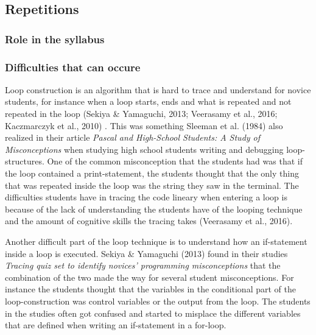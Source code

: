 \subsection{Repetitions}

\subsubsection{Role in the syllabus}

\subsubsection{Difficulties that can occure}

Loop construction is an algorithm that is hard to trace and understand for novice students, for instance when a loop starts, ends and what is repeated and not repeated in the loop (Sekiya \& Yamaguchi, 2013; Veerasamy et al., 2016; Kaczmarczyk et al., 2010) . This was something Sleeman et al. (1984) also realized in their article \emph{Pascal and High-School Students: A Study of Misconceptions} when studying high school students writing and debugging loop-structures. One of the common misconception that the students had was that if the loop contained a print-statement, the students thought that the only thing that was repeated inside the loop was the string they saw in the terminal. The difficulties students have in tracing the code lineary when entering a loop is because of the lack of understanding the students have of the looping technique and the amount of cognitive skills the tracing takes (Veerasamy et al., 2016). 

Another difficult part of the loop technique is to understand how an if-statement inside a loop is executed. Sekiya \& Yamaguchi (2013) found in their studies \emph{Tracing quiz set to identify novices' programming misconceptions} that the combination of the two made the way for several student misconceptions. For instance the students thought that the variables in the conditional part of the loop-construction was control variables or the output from the loop. The students in the studies often got confused and started to misplace the different variables that are defined when writing an if-statement in a for-loop.

